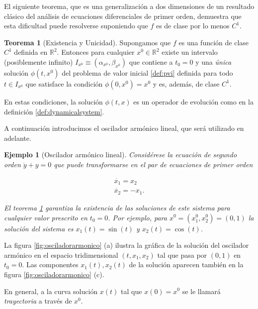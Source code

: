 \documentclass[11pt]{book}
\theoremstyle{definition}
\numberwithin{definition}{section}
\theoremstyle{theorem}
\newtheorem{theorem}{Teorema}
\numberwithin{theorem}{section}
\numberwithin{lemma}{section}
\numberwithin{corollary}{section}
\theoremstyle{plain}
\newtheorem{example}{Ejemplo}
\numberwithin{example}{section}
\newcommand{\R}{{\ensuremath{\mathbb{R}}}}
\begin{document}
El siguiente teorema, que es una generalización a dos dimensiones de un resultado clásico del análisis de ecuaciones diferenciales de primer orden, demuestra que esta dificultad puede resolverse suponiendo que $f$ es de clase por lo menos $C^1$.

\begin{theorem}[Existencia y Unicidad] \label{teo:existenciayunicidad} Supongamos que $f$ es una función de clase $C^1$ definida en $\R^2$. Entonces para cualquier $x^0 \in \R^2$ existe un intervalo (posiblemente infinito) $I_{x^0} \equiv (\alpha_{x^0}, \beta_{x^0})$ que contiene a $t_0 = 0$ y una \emph{única} solución $\phi(t,x^0)$ del problema de valor inicial \ref{def:pvi} definida para todo $t \in I_{x^0}$ que satisface la condición $\phi(0, x^0) = x^0$ y es, además, de clase $C^1$.
\end{theorem}

En estas condiciones, la solución $\phi(t,x)$ es un operador de evolución como en la definición \ref{def:dynamicalsystem}.

A continuación introducimos el oscilador armónico lineal, que será utilizado en adelante.

\begin{example}[Oscilador armónico lineal] \label{ej:osciladorarmonico} Considérese la ecuación de segundo orden $\ddot{y} + y = 0$ que puede transformarse en el par de ecuaciones de primer orden

\begin{equation} \label{eq:osciladorarmonico}
	\begin{array}{l}
		\dot{x_1} = x_2 \\
		\dot{x_2} = -x_1.
	\end{array}
\end{equation}

El teorema \ref{teo:existenciayunicidad} garantiza la existencia de las soluciones de este sistema para cualquier valor prescrito en $t_0 = 0$. Por ejemplo, para $x^0 = (x_1^0,x_2^0) = (0,1)$ la solución del sistema es $x_1(t) = \sin(t)$ y $x_2(t) = \cos(t)$.
\end{example}

La figura \ref{fig:osciladorarmonico} (a) ilustra la gráfica de la solución del oscilador armónico en el espacio tridimensional $(t,x_1,x_2)$ tal que pasa por $(0,1)$ en $t_0 = 0$. Las componentes $x_1(t), x_2(t)$ de la solución aparecen también en la figura \ref{fig:osciladorarmonico} (c).

En general, a la curva solución $x(t)$ tal que $x(0) = x^0$ se le llamará \emph{trayectoria} a través de $x^0$.
\end{document}
